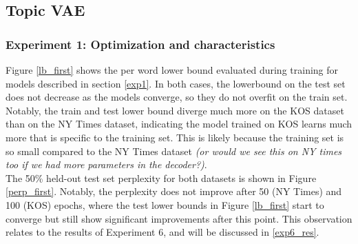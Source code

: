 \documentclass{report}
\begin{document}
	\subsection{Topic VAE}
	
	\subsubsection{Experiment 1: Optimization and characteristics}
	Figure \ref{lb_first} shows the per word lower bound evaluated during training for models described in section \ref{exp1}. In both cases, the lowerbound on the test set does not decrease as the models converge, so they do not overfit on the train set. Notably, the train and test lower bound diverge much more on the KOS dataset than on the NY Times dataset, indicating the model trained on KOS learns much more that is specific to the training set. This is likely because the training set is so small compared to the NY Times dataset \textit{(or would we see this on NY times too if we had more parameters in the decoder?)}.\\
	The 50\% held-out test set perplexity for both datasets is shown in Figure \ref{perp_first}. Notably, the perplexity does not improve after 50 (NY Times) and 100 (KOS) epochs, where the test lower bounds in Figure \ref{lb_first} start to converge but still show significant improvements after this point. This observation relates to the results of Experiment 6, and will be discussed in \ref{exp6_res}.
\end{document}

